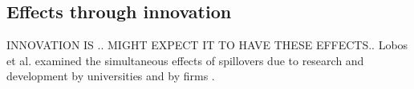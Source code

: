 





         


\subsection{Effects through innovation}
INNOVATION IS .. MIGHT EXPECT IT TO HAVE THESE EFFECTS.. 
Lobos et al. examined the simultaneous effects of spillovers due to research and development by universities and by firms \cite{belderbosWhatSpilloversUniversities2022}.

